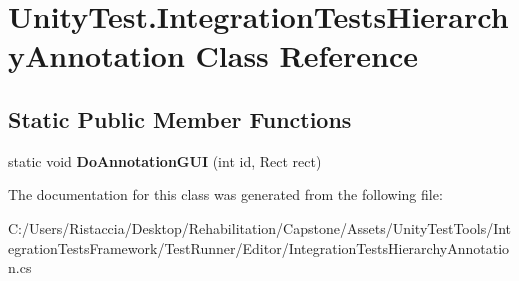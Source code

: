 \hypertarget{class_unity_test_1_1_integration_tests_hierarchy_annotation}{}\section{Unity\+Test.\+Integration\+Tests\+Hierarchy\+Annotation Class Reference}
\label{class_unity_test_1_1_integration_tests_hierarchy_annotation}
\subsection*{Static Public Member Functions}
\begin{DoxyCompactItemize}
\item 
\mbox{\label{class_unity_test_1_1_integration_tests_hierarchy_annotation_a6fd04b9533a9f8e994d8a1c5020e8c80}} 
static void {\bfseries Do\+Annotation\+G\+UI} (int id, Rect rect)
\end{DoxyCompactItemize}


The documentation for this class was generated from the following file\+:\begin{DoxyCompactItemize}
\item 
C\+:/\+Users/\+Ristaccia/\+Desktop/\+Rehabilitation/\+Capstone/\+Assets/\+Unity\+Test\+Tools/\+Integration\+Tests\+Framework/\+Test\+Runner/\+Editor/Integration\+Tests\+Hierarchy\+Annotation.\+cs\end{DoxyCompactItemize}
